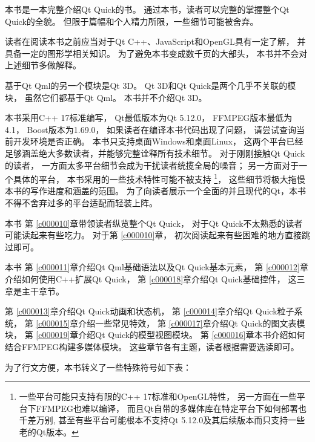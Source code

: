 本书是一本完整介绍Qt Quick的书。
通过本书，读者可以完整的掌握整个Qt Quick的全貌。
但限于篇幅和个人精力所限，一些细节可能被舍弃。

读者在阅读本书之前应当对于Qt C{\sourcefonttwo{}+}{\sourcefonttwo{}+}、JavaScript和OpenGL具有一定了解，
并具备一定的图形学相关知识。
为了避免本书变成数千页的大部头，
本书并不会对上述细节多做解释。

基于Qt Qml的另一个模块是Qt 3D。
Qt 3D和Qt Quick是两个几乎不关联的模块，
虽然它们都基于Qt Qml。
本书并不介绍Qt 3D。

本书采用C{\sourcefonttwo{}+}{\sourcefonttwo{}+} 17标准编写，
Qt最低版本为Qt 5.12.0，
FFMPEG版本最低为4.1，
Boost版本为1.69.0，
如果读者在编译本书代码出现了问题，
请尝试查询当前开发环境是否正确。
本书只支持桌面Windows和桌面Linux，
这两个平台已经足够涵盖绝大多数读者，并能够完整诠释所有技术细节。
对于刚刚接触Qt Quick的读者，
一方面太多平台细节会成为干扰读者统揽全局的噪音；
另一方面对于一个具体的平台，
本书采用的一些技术特性可能不被支持
\footnote{
一些平台可能只支持有限的C{\sourcefonttwo{}+}{\sourcefonttwo{}+} 17标准和OpenGL特性，
另一方面在一些平台下FFMPEG也难以编译，
而且Qt自带的多媒体库在特定平台下如何部署也千差万别,
甚至有些平台可能根本不支持Qt 5.12.0及其后续版本而只支持一些老的Qt版本。
}，
这些细节将极大拖慢本书的写作进度和涵盖的范围。
为了向读者展示一个全面的并且现代的Qt，本书不得不舍弃过多的平台适配而轻装上阵。

本书
第 \ref{c000010}章带领读者纵览整个Qt Quick，
对于Qt Quick不太熟悉的读者可能读起来有些吃力。
对于第 \ref{c000010}章，
初次阅读起来有些困难的地方直接跳过即可。

本书
第 \ref{c000011}章介绍Qt Qml基础语法以及Qt Quick基本元素，
第 \ref{c000012}章介绍如何使用C{\sourcefonttwo{}+}{\sourcefonttwo{}+}扩展Qt Quick，
第 \ref{c000018}章介绍Qt Quick基础控件，
这三章是主干章节。

第 \ref{c000013}章介绍Qt Quick动画和状态机，
第 \ref{c000014}章介绍Qt Quick粒子系统，
第 \ref{c000015}章介绍一些常见特效，
第 \ref{c000017}章介绍Qt Quick的图文表模块，
第 \ref{c000019}章介绍Qt Quick的模型视图模块。
第 \ref{c000016}章本书介绍如何结合FFMPEG构建多媒体模块。
这些章节各有主题，读者根据需要选读即可。

为了行文方便，本书转义了一些特殊符号如下表：






















